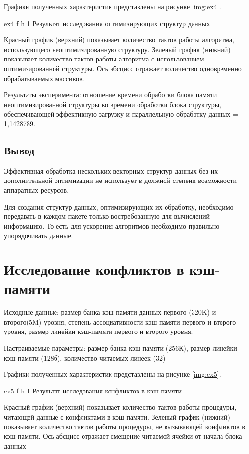 Графики полученных характеристик представлены на рисунке \ref{img:ex4}.

{ex4}
{f}
{h}
{1\textwidth}
{Результат  исследования оптимизирующих структур данных}

Красный график (верхний) показывает количество тактов работы алгоритма, использующего неоптимизированную структуру.
Зеленый график (нижний) показывает  количество тактов работы алгоритма с использованием оптимизированной структуры.
Ось абсцисс отражает количество одновременно обрабатываемых массивов.

Результаты эксперимента: отношение времени обработки блока памяти неоптимизированной структуры ко времени обработки блока структуры,
обеспечивающей эффективную загрузку и параллельную обработку данных = 1,1428789.

\section*{Вывод}
Эффективная обработка нескольких векторных структур данных без их дополнительной оптимизации не использует в должной степени возможности аппаратных ресурсов.

Для создания структур данных, оптимизирующих их обработку, необходимо передавать в каждом пакете только востребованную для вычислений информацию.
То есть для ускорения алгоритмов необходимо правильно упорядочивать данные.

\chapter{Исследование конфликтов в кэш-памяти}

Исходные данные: размер банка кэш-памяти данных первого (320K) и второго(5M) уровня, степень ассоциативности кэш-памяти первого и второго уровня, размер линейки кэш-памяти первого и второго уровня.

Настраиваемые параметры: размер банка кэш-памяти (256К), размер линейки кэш-памяти (128б), количество читаемых линеек (32).

Графики полученных характеристик представлены на рисунке \ref{img:ex5}.

{ex5}
{f}
{h}
{1\textwidth}
{Результат  исследования конфликтов в кэш-памяти}

Красный график (верхний) показывает  количество тактов работы процедуры, читающей данные с конфликтами в кэш-памяти.
Зеленый график (нижний) показывает количество тактов работы процедуры, не вызывающей конфликтов в кэш-памяти.
Ось абсцисс отражает смещение читаемой ячейки от начала блока данных

